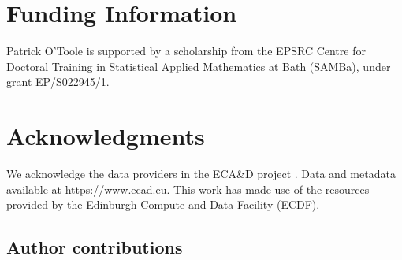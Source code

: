 \documentclass[APA,STIX1COL]{WileyNJD-v2}
\begin{document}


\section*{Funding Information}

Patrick O'Toole is supported by a scholarship from the EPSRC Centre for
Doctoral Training in Statistical Applied Mathematics at Bath (SAMBa), under
grant EP/S022945/1.

\section*{Acknowledgments}
We acknowledge the data providers in the ECA\&D project \citep{Klein2002}. Data and metadata available at \url{https://www.ecad.eu}. This work has made use of the resources provided by the Edinburgh Compute and Data Facility (ECDF). 

\subsection*{Author contributions}
\end{document}
